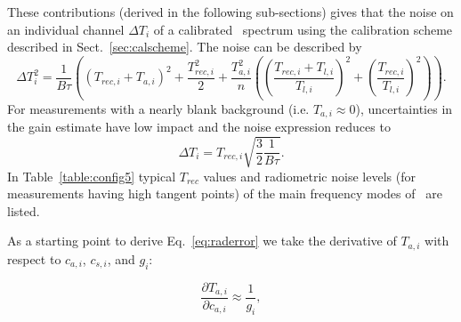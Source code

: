 These contributions (derived in the following sub-sections) gives that the noise on an individual channel \(\Delta T_{i}\) of a 
calibrated \smr\ spectrum using the calibration scheme described in Sect.~\ref{sec:calscheme}. 
The noise can be described by
\begin{equation}
\Delta T_{i}^{2} =  \frac{1}{B\tau} \left( (T_{rec,i}+T_{a,i})^2 + \frac{T_{rec,i}^2}{2} +
   \frac{T_{a,i}^{2}}{n} \left( \left( \frac{T_{rec,i} + T_{l,i}}{T_{l,i}} \right)^2 + 
   \left( \frac{T_{rec,i} }{T_{l,i}} \right)^2 \right) \right).
\label{eq:raderror}
\end{equation}
For measurements with a nearly blank background (i.e. \(T_{a,i}\approx\)0), uncertainties in the gain estimate 
have low impact and the noise expression reduces to
\begin{equation}
\Delta T_{i} =  T_{rec,i}\sqrt{\frac{3}{2}\frac{1}{B\tau}}.
\label{eq:higaltnoise}
\end{equation}
In Table~\ref{table:config5} typical \(T_{rec}\) values and radiometric noise levels
(for measurements having high tangent points)
of the main frequency modes of \smr\ are listed.



As a starting point to derive Eq.~\ref{eq:raderror} we take the derivative of \(T_{a,i}\) 
with respect to \(c_{a,i}\), \(c_{s,i}\), and \(g_{i}\):

\begin{equation}
\frac{\partial T_{a,i}}{\partial c_{a,i}} \approx \frac{1}{g_i}, 
\end{equation}

